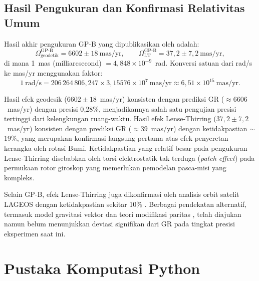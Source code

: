 \subsection{Hasil Pengukuran dan Konfirmasi Relativitas Umum}
\label{subsec:gpb-hasil}

Hasil akhir pengukuran GP-B yang dipublikasikan oleh \textcite{Everitt2011GravityProbeB} adalah:
\begin{equation}
    \Omega_{\text{geodetik}}^{\text{GP-B}} = 6602 \pm 18~\text{mas/yr}, \qquad
    \Omega_{\text{LT}}^{\text{GP-B}} = 37{,}2 \pm 7{,}2~\text{mas/yr},
    \label{eq:gpb-results}
\end{equation}
di mana 1~mas (milliarcsecond) $= 4{,}848 \times 10^{-9}$~rad. Konversi satuan dari rad/s ke mas/yr menggunakan faktor:
\begin{equation}
    1~\text{rad/s} = 206\,264\,806{,}247 \times 3{,}15576 \times 10^7~\text{mas/yr}
    \approx 6{,}51 \times 10^{15}~\text{mas/yr}.
    \label{eq:konversi-masyr}
\end{equation}

Hasil efek geodesik ($6602 \pm 18$~mas/yr) konsisten dengan prediksi GR ($\approx 6606$~mas/yr) dengan presisi 0{,}28\%, menjadikannya salah satu pengujian presisi tertinggi dari kelengkungan ruang-waktu. Hasil efek Lense-Thirring ($37{,}2 \pm 7{,}2$~mas/yr) konsisten dengan prediksi GR ($\approx 39$~mas/yr) dengan ketidakpastian $\sim$19\%, yang merupakan konfirmasi langsung pertama atas efek penyeretan kerangka oleh rotasi Bumi. Ketidakpastian yang relatif besar pada pengukuran Lense-Thirring disebabkan oleh torsi elektrostatik tak terduga (\textit{patch effect}) pada permukaan rotor giroskop yang memerlukan pemodelan pasca-misi yang kompleks.

Selain GP-B, efek Lense-Thirring juga dikonfirmasi oleh analisis orbit satelit LAGEOS dengan ketidakpastian sekitar 10\% \parencite{CiufoliniPavlis2004_LAGEOS}. Berbagai pendekatan alternatif, termasuk model gravitasi vektor \parencite{BeheraBarik2020} dan teori modifikasi paritas \parencite{Mao2006, Nakamura2018}, telah diajukan namun belum menunjukkan deviasi signifikan dari GR pada tingkat presisi eksperimen saat ini.


\section{Pustaka Komputasi Python}
\label{sec:pustaka-python}

